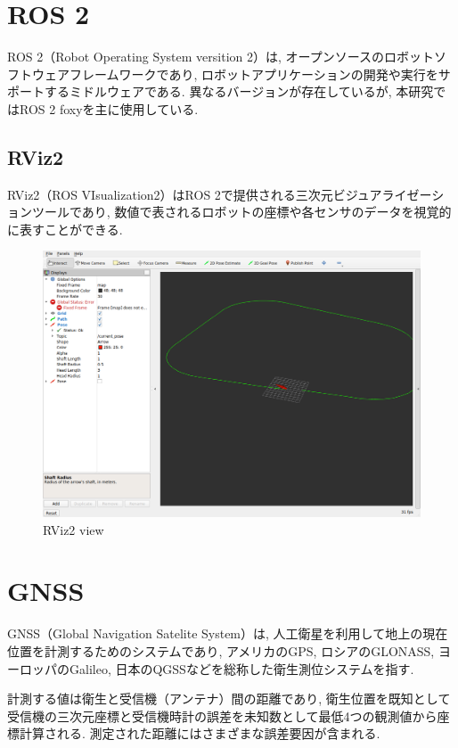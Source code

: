 
\section{ROS 2}
ROS 2（Robot Operating System versition 2）は, オープンソースのロボットソフトウェアフレームワークであり,
ロボットアプリケーションの開発や実行をサポートするミドルウェアである.
異なるバージョンが存在しているが, 本研究ではROS 2 foxyを主に使用している.

\subsection{RViz2}
RViz2（ROS VIsualization2）はROS 2で提供される三次元ビジュアライゼーションツールであり, 
数値で表されるロボットの座標や各センサのデータを視覚的に表すことができる.

\begin{figure}[H]
  \centering
 \includegraphics[keepaspectratio, scale=0.4]
     {images/rviz.png}
 \caption{RViz2 view}
 \label{fig:purepursuit}
\end{figure}

\section{GNSS}
GNSS（Global Navigation Satelite System）は, 
人工衛星を利用して地上の現在位置を計測するためのシステムであり, 
アメリカのGPS, ロシアのGLONASS, ヨーロッパのGalileo, 日本のQGSSなどを総称した衛生測位システムを指す.

計測する値は衛生と受信機（アンテナ）間の距離であり, 衛生位置を既知として受信機の三次元座標と受信機時計の誤差を未知数として最低4つの観測値から座標計算される.
測定された距離にはさまざまな誤差要因が含まれる.

